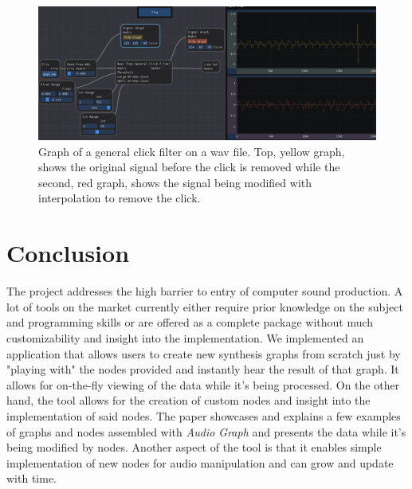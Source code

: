 \documentclass[conference]{IEEEtran}
\begin{document}
\begin{figure}[btp]
    \centering
    \includegraphics[width=0.9\linewidth]{graphics/generalclickfilter.png}
    \caption{Graph of a general click filter on a wav file. Top, yellow graph, shows the original signal before the click is removed while the second, red graph, shows the signal being modified with interpolation to remove the click.}
    \label{fig:generalclickfilter}
\end{figure}

\section{Conclusion}
The project addresses the high barrier to entry of computer sound production. A lot of tools on the market currently either require prior knowledge on the subject and programming skills or are offered as a complete package without much customizability and insight into the implementation. We implemented an application that allows users to create new synthesis graphs from scratch just by "playing with" the nodes provided and instantly hear the result of that graph. It allows for on-the-fly viewing of the data while it's being processed. On the other hand, the tool allows for the creation of custom nodes and insight into the implementation of said nodes. The paper showcases and explains a few examples of graphs and nodes assembled with \textit{Audio Graph} and presents the data while it's being modified by nodes. Another aspect of the tool is that it enables simple implementation of new nodes for audio manipulation and can grow and update with time.
\end{document}
